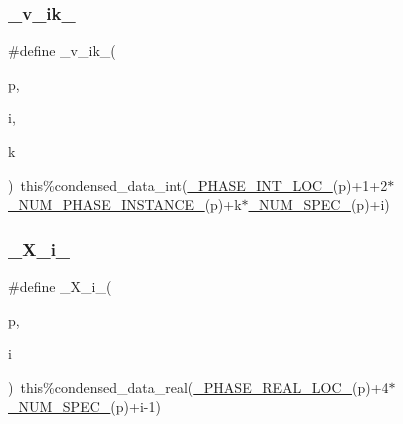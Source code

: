\mbox{\label{sub__model___u_n_i_f_a_c_8_f90_a243d3b336ab8d54ce6fa47e406ab8b0b}} 
\subsubsection{\texorpdfstring{\+\_\+v\+\_\+ik\+\_\+}{\_v\_ik\_}}
{\footnotesize\ttfamily \#define \+\_\+v\+\_\+ik\+\_\+(\begin{DoxyParamCaption}\item[{}]{p,  }\item[{}]{i,  }\item[{}]{k }\end{DoxyParamCaption})~this\%condensed\+\_\+data\+\_\+int(\mbox{\hyperlink{sub__model___u_n_i_f_a_c_8_f90_a1d3113ce4335ed8f59d5278a96baf2db}{\+\_\+\+P\+H\+A\+S\+E\+\_\+\+I\+N\+T\+\_\+\+L\+O\+C\+\_\+}}(p)+1+2$\ast$\mbox{\hyperlink{sub__model___u_n_i_f_a_c_8_f90_ad23acf7c0b198dc8792d7404114004ea}{\+\_\+\+N\+U\+M\+\_\+\+P\+H\+A\+S\+E\+\_\+\+I\+N\+S\+T\+A\+N\+C\+E\+\_\+}}(p)+k$\ast$\mbox{\hyperlink{sub__model___u_n_i_f_a_c_8_f90_a6a6c2afb1b313ca5d982039833f5da8a}{\+\_\+\+N\+U\+M\+\_\+\+S\+P\+E\+C\+\_\+}}(p)+i)}

\mbox{\label{sub__model___u_n_i_f_a_c_8_f90_acc8bb60e8eb22bd6d750c36ee9d958ec}} 
\subsubsection{\texorpdfstring{\+\_\+\+X\+\_\+i\+\_\+}{\_X\_i\_}}
{\footnotesize\ttfamily \#define \+\_\+\+X\+\_\+i\+\_\+(\begin{DoxyParamCaption}\item[{}]{p,  }\item[{}]{i }\end{DoxyParamCaption})~this\%condensed\+\_\+data\+\_\+real(\mbox{\hyperlink{sub__model___u_n_i_f_a_c_8_f90_a82db0e0fff4e8ab602fb50bebe0b7c38}{\+\_\+\+P\+H\+A\+S\+E\+\_\+\+R\+E\+A\+L\+\_\+\+L\+O\+C\+\_\+}}(p)+4$\ast$\mbox{\hyperlink{sub__model___u_n_i_f_a_c_8_f90_a6a6c2afb1b313ca5d982039833f5da8a}{\+\_\+\+N\+U\+M\+\_\+\+S\+P\+E\+C\+\_\+}}(p)+i-\/1)}

